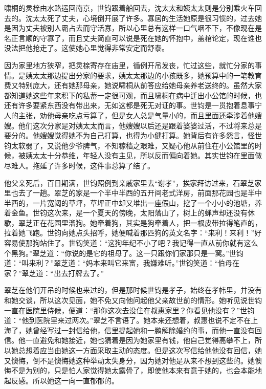 \par 啸桐的灵榇由水路运回南京，世钧跟着船回去，沈太太和姨太太则是分别乘火车回去的。沈太太死了丈夫，心境倒开展了许多。寡居的生活她原是很习惯的，过去她是因为丈夫被别人霸占去而守活寡，所以心里总有这样一口气咽不下，不像现在是名正言顺的守寡了，而且丈夫简直可以说是死在她的怀抱中，盖棺论定，现在谁也没法把他抢走了。这使她心里觉得非常安定而舒泰。
\par 因为家里地方狭窄，把灵榇寄存在庙里，循例开吊发丧，忙过这些，就忙分家的事情。是姨太太那边提出分家的要求，姨太太那边的小孩既多，她预算中的一笔教育费又特别庞大，还有她那母亲，她说啸桐从前答应给她母亲养老送终的。虽然大家都知道她这些年来积下的私蓄一定很可观，而且啸桐在病中迁出小公馆的时候，也还有许多要紧东西没有带出来，无如这都是死无对证的事。世钧是一贯抱着息事宁人的主张，劝他母亲吃点亏算了，但是女人总是气量小的，而且里面还牵涉着他嫂嫂。他们这次分家是对姨太太而言，他嫂嫂以后还是跟着婆婆过活，不过将来总是要分的。他嫂嫂觉得她不为自己打算，也得为小健打算。她背后有许多怨言，怪世钧太软弱了，又说他少爷脾气，不知稼穑之艰难，又疑心他从前住在小公馆里的时候，被姨太太十分恭维，年轻人没有主见，所以反而偏向着她。其实世钧在里面做尽难人。拖延了许多时候，这件事总算了结了。
\par 他父亲死后，百日期满，世钧照例到亲戚家里去“谢孝”，挨家拜访过来，石翠芝家里也去了一趟。翠芝的家是一个半中半西的五开间老式洋房，前面那花园也是半中半西的，一片宽阔的草坪，草坪正中却又堆出一座假山，挖了一个小小的池塘，养着金鱼。世钧这次来，是一个夏天的傍晚，太阳落山了，树上的蝉声却还没有休歇，翠芝正在花园里溜狗。她牵着狗，其实是狗牵着人，把一根皮带拉得笔直的，拉着她飞跑。世钧向她点头招呼，她便喊着那匹狗的英文名字：“来利！来利！”好容易使那狗站住了。世钧笑道：“这狗年纪不小了吧？我记得一直从前你就有这么个黑狗。”翠芝道：“你说的是它的祖母了。这一只跟你们家那只是一窝。”世钧道：“叫来利？”翠芝道：“妈本来叫它来富，我嫌难听。”世钧笑道：“伯母在家？”翠芝道：“出去打牌去了。”
\par 翠芝在他们开吊的时候也来过的，但是那时候世钧是孝子，始终在孝帏里，并没有和她交谈，所以这次见面，她不免又向他问起他父亲故世前的情形。她听见说世钧一直在医院里侍候，便道：“那你这次去没住在叔惠家里？你看见他没有？”世钧道：“他到医院里来过两次。”翠芝不言语了。她本来还想着，叔惠也说不定不在上海了，她曾经写过一封信给他，信里提起她和一鹏解除婚约的事，而他一直没有回信。他一直避免和她接近，她也猜着是因为她家里有钱，他自己觉得高攀不上，所以她总想着应当由她这一方面采取主动的态度。但是这次写信给他他没有回信，她又懊悔，倒不是懊悔她这种举动太失身分，因为她对他是从来不想到这些的。她懊悔不是为别的，只是怕人家觉得她太露骨了，即使他本来有意于她的，也会本能地起反感。所以她这一向一直郁郁的。
